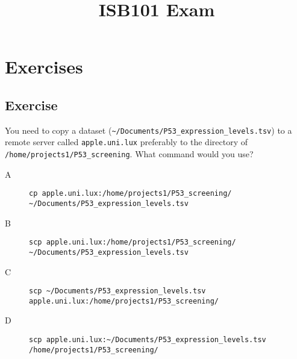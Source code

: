 \documentclass{article}\usepackage[]{graphicx}\usepackage[usenames,dvipsnames]{color}
\title{ISB101 Exam}
\begin{document}
\maketitle

\addtocounter{ExerciseNr}{1}

\section{Exercises} \label{sec:exercises}

\subsection{Exercise }

You need to copy a dataset (\verb+~/Documents/P53_expression_levels.tsv+) to a remote server called \verb+apple.uni.lux+ preferably to the directory of \verb+/home/projects1/P53_screening+. What command would you use?

\begin{description}
  \item[A] \verb+cp apple.uni.lux:/home/projects1/P53_screening/ ~/Documents/P53_expression_levels.tsv+
  \item[B] \verb+scp apple.uni.lux:/home/projects1/P53_screening/ ~/Documents/P53_expression_levels.tsv+
  \item[C] \verb+scp ~/Documents/P53_expression_levels.tsv apple.uni.lux:/home/projects1/P53_screening/+
  \item[D] \verb+scp apple.uni.lux:~/Documents/P53_expression_levels.tsv /home/projects1/P53_screening/+
\end{description}
\end{document}
